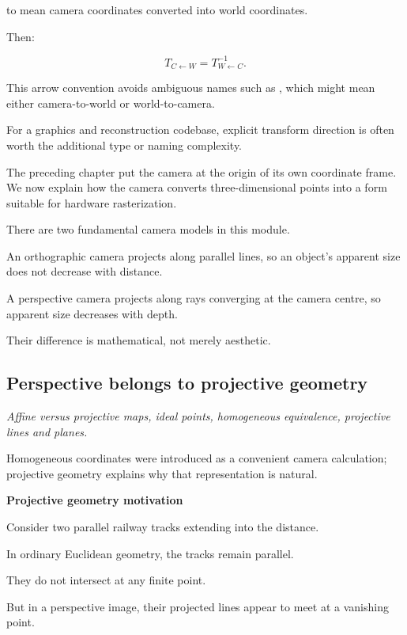 to mean camera coordinates converted into world coordinates.

Then:

\[
 T_{C\leftarrow W} = T_{W\leftarrow C}^{-1}.
\]

This arrow convention avoids ambiguous names such as , which might mean either camera-to-world or world-to-camera.

For a graphics and reconstruction codebase, explicit transform direction is often worth the additional type or naming complexity.

The preceding chapter put the camera at the origin of its own coordinate frame. We now explain how the camera converts three-dimensional points into a form suitable for hardware rasterization.

There are two fundamental camera models in this module.

An orthographic camera projects along parallel lines, so an object's apparent size does not decrease with distance.

A perspective camera projects along rays converging at the camera centre, so apparent size decreases with depth.

Their difference is mathematical, not merely aesthetic.

\subsection{Perspective belongs to projective geometry}\label{02-foundations-ii-ch032-perspective-belongs-to-projective-geometry}

\hypertarget{02-foundations-ii-ch032-perspective-belongs-to-projective-geometry}{}

\emph{Affine versus projective maps, ideal points, homogeneous equivalence, projective lines and planes.}

Homogeneous coordinates were introduced as a convenient camera calculation; projective geometry explains why that representation is natural.

\textbf{Projective geometry motivation}

Consider two parallel railway tracks extending into the distance.

In ordinary Euclidean geometry, the tracks remain parallel.

They do not intersect at any finite point.

But in a perspective image, their projected lines appear to meet at a vanishing point.

